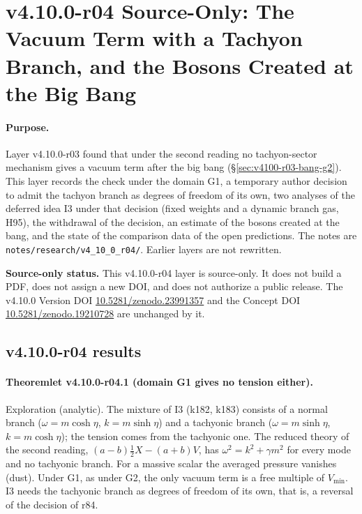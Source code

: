 \clearpage
\section*{v4.10.0-r04 Source-Only: The Vacuum Term with a Tachyon Branch, and the Bosons Created at the Big Bang}
\label{sec:v4100-r04-tachyon-branch}

\paragraph{Purpose.}
Layer v4.10.0-r03 found that under the second reading no tachyon-sector mechanism gives a vacuum term after the big bang
(\S\ref{sec:v4100-r03-bang-g2}).  This layer records the check under the domain G1, a temporary author decision to admit the tachyon branch
as degrees of freedom of its own, two analyses of the deferred idea I3 under that decision (fixed weights and a dynamic branch gas, H95),
the withdrawal of the decision, an estimate of the bosons created at the bang, and the state of the comparison data of the open predictions.
The notes are \texttt{notes/\allowbreak research/\allowbreak v4\_10\_0\_r04/}.  Earlier layers are not rewritten.

\noindent\textbf{Source-only status.}
This v4.10.0-r04 layer is source-only.  It does not build a PDF, does not assign a new DOI,
and does not authorize a public release.  The v4.10.0 Version DOI
\href{https://doi.org/10.5281/zenodo.23991357}{10.5281/zenodo.23991357} and the Concept DOI
\href{https://doi.org/10.5281/zenodo.19210728}{10.5281/zenodo.19210728} are unchanged by it.

\subsection*{v4.10.0-r04 results}
\label{subsec:v4100-r04-results}

\paragraph{Theoremlet v4.10.0-r04.1 (domain G1 gives no tension either).}
Exploration (analytic).  The mixture of I3 (k182, k183) consists of a normal branch (\(\omega=m\cosh\eta\), \(k=m\sinh\eta\)) and a tachyonic
branch (\(\omega=m\sinh\eta\), \(k=m\cosh\eta\)); the tension comes from the tachyonic one.  The reduced theory of the second reading,
\((a-b)\tfrac12X-(a+b)V\), has \(\omega^2=k^2+\gamma m^2\) for every mode and no tachyonic branch.  For a massive scalar the averaged pressure
vanishes (dust).  Under G1, as under G2, the only vacuum term is a free multiple of \(V_{\min}\).  I3 needs the tachyonic branch as degrees of freedom
of its own, that is, a reversal of the decision of r84.

